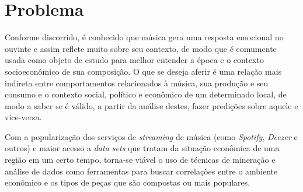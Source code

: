 \section{Problema}
\label{c.problema}

Conforme discorrido, é conhecido que música gera uma resposta emocional no ouvinte e assim reflete muito sobre seu contexto, de modo que é comumente usada como objeto de estudo para melhor entender a época e o contexto socioeconômico de sua composição. O que se deseja aferir é uma relação mais indireta entre comportamentos relacionados à música, sua produção e seu consumo e o contexto social, político e econômico de um determinado local, de modo a saber se é válido, a partir da análise destes, fazer predições sobre aquele e vice-versa.
    
Com a popularização dos serviços de \textit{streaming} de música (como \textit{Spotify}, \textit{Deezer} e outros) e maior acesso a \textit{data sets} que tratam da situação econômica de uma região em um certo tempo, torna-se viável o uso de técnicas de mineração e análise de dados como ferramentas para buscar correlações entre o ambiente econômico e os tipos de peças que são compostas ou mais populares.